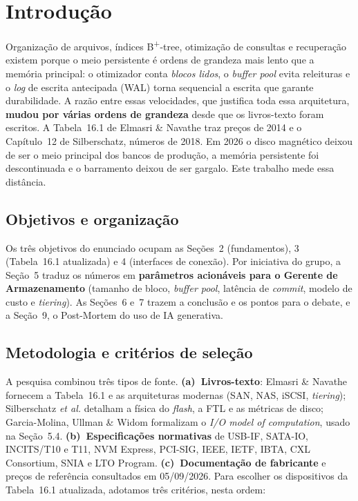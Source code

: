 \documentclass[11pt,a4paper]{article}
\begin{document}
\section{Introdução}

Organização de arquivos, índices B\textsuperscript{+}-tree, otimização de consultas e
recuperação existem porque o meio persistente é ordens de grandeza mais lento que a memória
principal: o otimizador conta \emph{blocos lidos}, o \emph{buffer pool} evita releituras e o
\emph{log} de escrita antecipada (WAL) torna sequencial a escrita que garante durabilidade. A
razão entre essas velocidades, que justifica toda essa arquitetura, \textbf{mudou por várias
ordens de grandeza} desde que os livros-texto foram escritos. A Tabela~16.1 de Elmasri \&
Navathe traz preços de 2014 e o Capítulo~12 de Silberschatz, números de 2018. Em 2026 o disco
magnético deixou de ser o meio principal dos bancos de produção, a memória persistente foi
descontinuada e o barramento deixou de ser gargalo. Este trabalho mede essa distância.

\subsection{Objetivos e organização}

Os três objetivos do enunciado ocupam as Seções~2 (fundamentos), 3 (Tabela~16.1 atualizada)
e 4 (interfaces de conexão). Por iniciativa do grupo, a Seção~5 traduz os números em
\textbf{parâmetros acionáveis para o Gerente de Armazenamento} (tamanho de bloco,
\emph{buffer pool}, latência de \emph{commit}, modelo de custo e \emph{tiering}). As
Seções~6 e~7 trazem a conclusão e os pontos para o debate, e a Seção~9, o Post-Mortem do uso
de IA generativa.

\subsection{Metodologia e critérios de seleção}

A pesquisa combinou três tipos de fonte. \textbf{(a)~Livros-texto}: Elmasri \& Navathe
fornecem a Tabela~16.1 e as arquiteturas modernas (SAN, NAS, iSCSI, \emph{tiering});
Silberschatz \emph{et al.} detalham a física do \emph{flash}, a FTL e as métricas de disco;
Garcia-Molina, Ullman \& Widom formalizam o \emph{I/O model of computation}, usado na
Seção~5.4. \textbf{(b)~Especificações normativas} de USB-IF, SATA-IO, INCITS/T10 e T11,
NVM Express, PCI-SIG, IEEE, IETF, IBTA, CXL Consortium, SNIA e LTO Program.
\textbf{(c)~Documentação de fabricante} e preços de referência consultados em 05/09/2026.
Para escolher os dispositivos da Tabela~16.1 atualizada, adotamos três critérios, nesta ordem:
\end{document}

